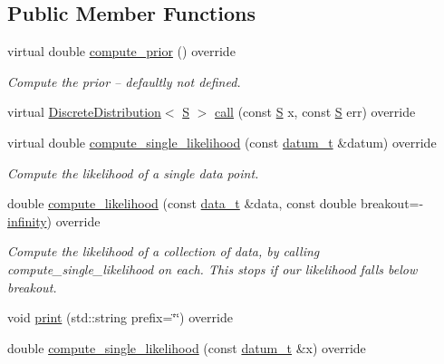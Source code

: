\subsection*{Public Member Functions}
\begin{DoxyCompactItemize}
\item 
virtual double \hyperlink{class_my_hypothesis_ab092094c5fc31730de4f40609220bb18}{compute\+\_\+prior} () override
\begin{DoxyCompactList}\small\item\em Compute the prior -- defaultly not defined. \end{DoxyCompactList}\item 
virtual \hyperlink{class_discrete_distribution}{Discrete\+Distribution}$<$ \hyperlink{_models_2_formal_language_theory-_complex_2main_8cpp_a51c40915539205f0b5add30b0d68a4cb}{S} $>$ \hyperlink{class_my_hypothesis_a61391d3f1f6fbbe37663b22e2068ac90}{call} (const \hyperlink{_models_2_formal_language_theory-_complex_2main_8cpp_a51c40915539205f0b5add30b0d68a4cb}{S} x, const \hyperlink{_models_2_formal_language_theory-_complex_2main_8cpp_a51c40915539205f0b5add30b0d68a4cb}{S} err) override
\item 
virtual double \hyperlink{class_my_hypothesis_af2470b1e04711c06ee551deae15af4c1}{compute\+\_\+single\+\_\+likelihood} (const \hyperlink{class_bayesable_a9f1a6c0cd7855550fa10b1a8f13a5867}{datum\+\_\+t} \&datum) override
\begin{DoxyCompactList}\small\item\em Compute the likelihood of a single data point. \end{DoxyCompactList}\item 
double \hyperlink{class_my_hypothesis_a42d7d139cd23f30342e1393fd0873dd1}{compute\+\_\+likelihood} (const \hyperlink{class_bayesable_aa2788c4d7718c0a824e1d28c4c98f921}{data\+\_\+t} \&data, const double breakout=-\/\hyperlink{_numerics_8h_a1bb1e42ae1b40cad6e99da0aab8a5576}{infinity}) override
\begin{DoxyCompactList}\small\item\em Compute the likelihood of a collection of data, by calling compute\+\_\+single\+\_\+likelihood on each. This stops if our likelihood falls below breakout. \end{DoxyCompactList}\item 
void \hyperlink{class_my_hypothesis_a91fd22a2724e04c0e7c67ea4282beac4}{print} (std\+::string prefix=\char`\"{}\char`\"{}) override
\item 
double \hyperlink{class_my_hypothesis_af23a45a03a28ea4f42438e70d47acacb}{compute\+\_\+single\+\_\+likelihood} (const \hyperlink{class_bayesable_a9f1a6c0cd7855550fa10b1a8f13a5867}{datum\+\_\+t} \&x) override

\end{DoxyCompactItemize}
